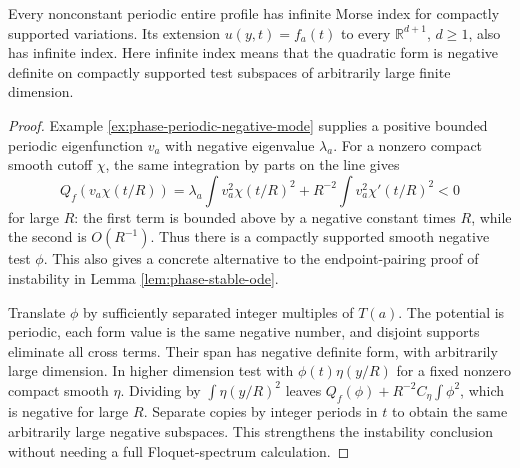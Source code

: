 \begin{proposition}\label{prop:phase-periodic-infinite-index}
Every nonconstant periodic entire profile has infinite Morse index for compactly supported variations. Its extension $u(y,t)=f_a(t)$ to every $\mathbb R^{d+1}$, $d\geq1$, also has infinite index. Here infinite index means that the quadratic form is negative definite on compactly supported test subspaces of arbitrarily large finite dimension.
\end{proposition}
\begin{proof}
Example \ref{ex:phase-periodic-negative-mode} supplies a positive bounded periodic eigenfunction $v_a$ with negative eigenvalue $\lambda_a$. For a nonzero compact smooth cutoff $\chi$, the same integration by parts on the line gives
\[
 Q_f(v_a\chi(t/R))
 =\lambda_a\int v_a^2\chi(t/R)^2+
   R^{-2}\int v_a^2\chi'(t/R)^2<0
\]
for large $R$: the first term is bounded above by a negative constant times $R$, while the second is $O(R^{-1})$. Thus there is a compactly supported smooth negative test $\phi$. This also gives a concrete alternative to the endpoint-pairing proof of instability in Lemma \ref{lem:phase-stable-ode}.

Translate $\phi$ by sufficiently separated integer multiples of $T(a)$. The potential is periodic, each form value is the same negative number, and disjoint supports eliminate all cross terms. Their span has negative definite form, with arbitrarily large dimension. In higher dimension test with $\phi(t)\eta(y/R)$ for a fixed nonzero compact smooth $\eta$. Dividing by $\int\eta(y/R)^2$ leaves $Q_f(\phi)+R^{-2}C_\eta\int\phi^2$, which is negative for large $R$. Separate copies by integer periods in $t$ to obtain the same arbitrarily large negative subspaces. This strengthens the instability conclusion without needing a full Floquet-spectrum calculation.
\end{proof}
